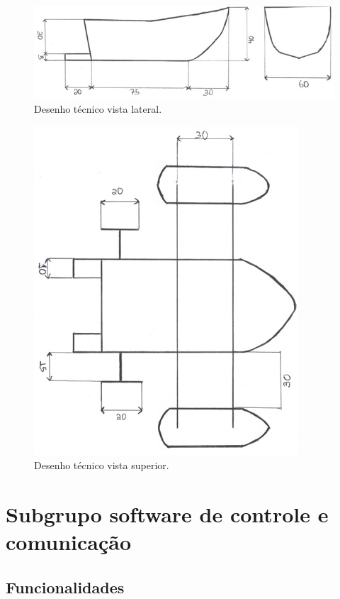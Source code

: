 \FloatBarrier
 \begin{figure} [!htp]
	\centering
	\includegraphics[scale=1]{figuras/roboat_lateral}
	\caption{Desenho técnico vista lateral.}
	\label{dtl}
\end{figure}
\FloatBarrier

\FloatBarrier
 \begin{figure} [!htp]
	\centering
	\includegraphics[scale=1]{figuras/roboat_sup}
	\caption{Desenho técnico vista superior.}
	\label{dts}
\end{figure}
\FloatBarrier


\section{Subgrupo software de controle e comunicação}

\subsection{Funcionalidades}

